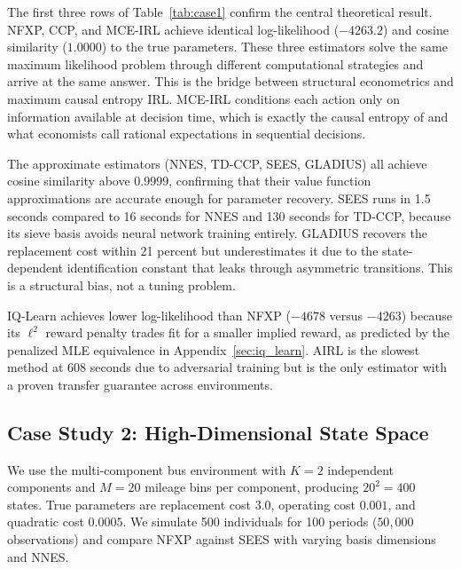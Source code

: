 The first three rows of Table~\ref{tab:case1} confirm the central theoretical result.
NFXP, CCP, and MCE-IRL achieve identical log-likelihood ($-4263.2$) and cosine similarity ($1.0000$) to the true parameters.
These three estimators solve the same maximum likelihood problem through different computational strategies and arrive at the same answer.
This is the bridge between structural econometrics and maximum causal entropy IRL.
MCE-IRL conditions each action only on information available at decision time, which is exactly the causal entropy of \citet{ziebart2010} and what economists call rational expectations in sequential decisions.

The approximate estimators (NNES, TD-CCP, SEES, GLADIUS) all achieve cosine similarity above 0.9999, confirming that their value function approximations are accurate enough for parameter recovery.
SEES runs in 1.5 seconds compared to 16 seconds for NNES and 130 seconds for TD-CCP, because its sieve basis avoids neural network training entirely.
GLADIUS recovers the replacement cost within 21 percent but underestimates it due to the state-dependent identification constant that leaks through asymmetric transitions.
This is a structural bias, not a tuning problem.

IQ-Learn achieves lower log-likelihood than NFXP ($-4678$ versus $-4263$) because its $\ell^2$ reward penalty trades fit for a smaller implied reward, as predicted by the penalized MLE equivalence in Appendix~\ref{sec:iq_learn}.
AIRL is the slowest method at 608 seconds due to adversarial training but is the only estimator with a proven transfer guarantee across environments.


\subsection{Case Study 2: High-Dimensional State Space}
\label{sec:case2}

We use the multi-component bus environment with $K=2$ independent components and $M=20$ mileage bins per component, producing $20^2 = 400$ states.
True parameters are replacement cost $3.0$, operating cost $0.001$, and quadratic cost $0.0005$.
We simulate 500 individuals for 100 periods ($50{,}000$ observations) and compare NFXP against SEES with varying basis dimensions and NNES.

